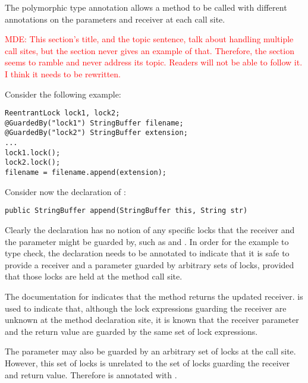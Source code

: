 The polymorphic  type annotation allows a method
to be called with different  annotations on the parameters
and receiver at each call site.

\textcolor{red}{MDE:  This section's title, and the topic sentence, talk
  about handling multiple call sites, but the section never gives an
  example of that.  Therefore, the section seems to ramble and never
  address its topic.  Readers will not be able to follow it.  I think it
  needs to be rewritten.}


Consider the following example:

\begin{verbatim}
ReentrantLock lock1, lock2;
@GuardedBy("lock1") StringBuffer filename;
@GuardedBy("lock2") StringBuffer extension;
...
lock1.lock();
lock2.lock();
filename = filename.append(extension);
\end{verbatim}

Consider now the declaration of :

\begin{verbatim}
public StringBuffer append(StringBuffer this, String str)
\end{verbatim}

Clearly the declaration has no notion of any specific locks that the receiver
and the  parameter might be guarded by, such as  and .
In order for the example to type check, the declaration needs to be annotated
to indicate that it is safe to provide a receiver and a parameter guarded by
arbitrary sets of locks, provided that those locks are held at the method
call site.

The documentation for 
indicates that the method returns the updated receiver.
 is used
to indicate that, although the lock expressions guarding the receiver
are unknown at the method declaration site, it is known that the receiver
parameter and the return value are guarded by the same set of lock expressions.

The parameter  may also be guarded by an arbitrary set of locks at the call
site.  However, this set of locks is unrelated to the set of locks guarding
the receiver and return value.  Therefore  is annotated with
.

